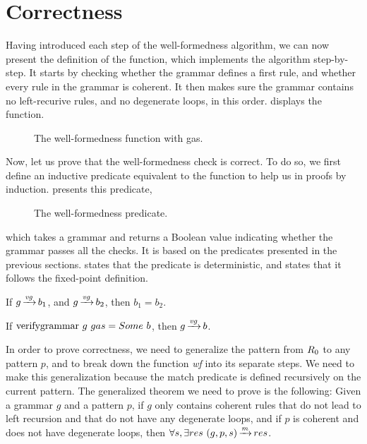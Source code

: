 \section{Correctness}

Having introduced each step of the well-formedness algorithm,
we can now present the definition of the \textit{\verifygrammarname{}} function,
which implements the algorithm step-by-step.
It starts by checking whether the grammar defines a first rule,
and whether every rule in the grammar is coherent.
It then makes sure the grammar contains no left-recurive rules,
and no degenerate loops, in this order.
 displays the function.
\begin{figure}
    \centering
    
    \caption{The well-formedness function with gas.}
    \label{fig:verifygrammar-function}
\end{figure}

Now, let us prove that the well-formedness check is correct.
To do so, we first define an
inductive predicate equivalent to
the \textit{\verifygrammarname{}} function
to help us in proofs by induction.
presents this predicate,
\begin{figure}
    \centering
    
    \caption{The well-formedness predicate.}
    \label{fig:verifygrammar}
\end{figure}
which takes a grammar
and returns a Boolean value
indicating whether the grammar
passes all the checks.
It is based on the predicates
presented in the previous sections.
states that the predicate is deterministic,
and 
states that it follows the fixed-point definition.

\begin{lemma}
    \label{lemma:verifygrammar-determinism}
    If $g \operatorname{\xrightarrow{\mathit{vg}}} b_1$,
    and $g \operatorname{\xrightarrow{\mathit{vg}}} b_2$,
    then $b_1 = b_2$.
\end{lemma}

\begin{lemma}
    \label{lemma:verifygrammar-follows}
    If $\text{verifygrammar{}}\ g\ gas = Some\ b$,
    then $g \operatorname{\xrightarrow{\mathit{vg}}} b$.
\end{lemma}

In order to prove correctness,
we need to generalize the pattern from $R_{0}$
to any pattern $p$,
and to break down the function \textit{wf}
into its separate steps.
We need to make this generalization
because the match predicate is defined
recursively on the current pattern.
The generalized theorem we need to prove is the following:
Given a grammar $g$ and a pattern $p$,
if $g$ only contains coherent rules
that do not lead to left recursion
and that do not have any degenerate loops,
and if $p$ is coherent
and does not have degenerate loops,
then ${\forall s, \exists res\ \Matches{g}{p}{s}{res}}$.

